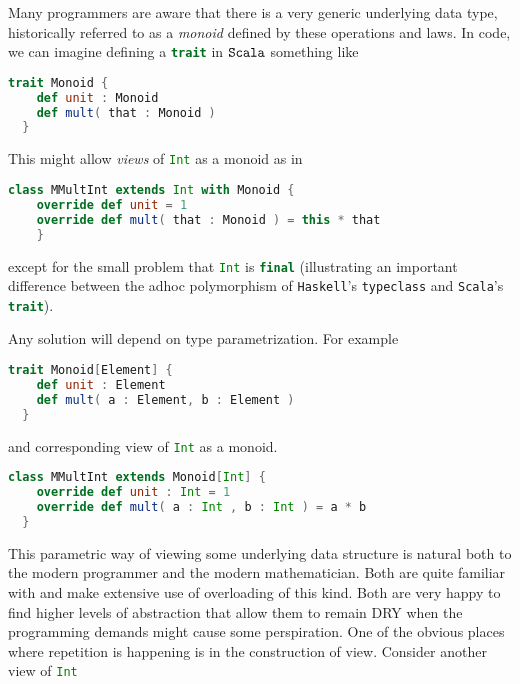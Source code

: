 Many programmers are aware that there is a very generic underlying
data type, historically referred to as a \emph{monoid} defined by
these operations and laws. In code, we can imagine defining a
\lstinline[language=Scala]!trait! in $\texttt{Scala}$ something like

\begin{lstlisting}[language=Scala]
  trait Monoid {
    def unit : Monoid
    def mult( that : Monoid ) 
  }
\end{lstlisting}

This might allow \emph{views} of \lstinline[language=Scala]!Int! as a monoid as in

\begin{lstlisting}[language=Scala]
  class MMultInt extends Int with Monoid {
    override def unit = 1
    override def mult( that : Monoid ) = this * that
    }
\end{lstlisting}

except for the small problem that \lstinline[language=Scala]!Int! is
\lstinline[language=Scala]!final! (illustrating an important
difference between the adhoc polymorphism of \texttt{Haskell}'s
\lstinline[language=Haskell]!typeclass! and \texttt{Scala}'s
\lstinline[language=Scala]!trait!).

Any solution will depend on type parametrization. For example

\begin{lstlisting}[language=Scala]
  trait Monoid[Element] {
    def unit : Element
    def mult( a : Element, b : Element ) 
  }
\end{lstlisting}

and corresponding view of \lstinline[language=Scala]!Int! as a monoid.

\begin{lstlisting}[language=Scala]
  class MMultInt extends Monoid[Int] {
    override def unit : Int = 1
    override def mult( a : Int , b : Int ) = a * b
  }
\end{lstlisting}

This parametric way of viewing some underlying data structure is
natural both to the modern programmer and the modern
mathematician. Both are quite familiar with and make extensive use of
overloading of this kind. Both are very happy to find higher levels of
abstraction that allow them to remain DRY when the programming demands
might cause some perspiration. One of the obvious places where
repetition is happening is in the construction of view. Consider
another view of \lstinline[language=Scala]!Int!

